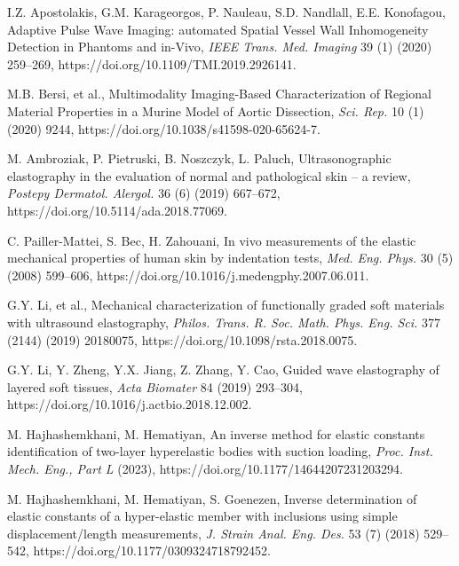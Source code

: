 \documentclass[11pt]{article}
\begin{document}
\begin{list}{}{%
  \setlength{\leftmargin}{2em}%
  \setlength{\itemindent}{-2em}%
  \setlength{\itemsep}{0.5em}%
  \setlength{\parsep}{0pt}%
}
\item [12] I.Z. Apostolakis, G.M. Karageorgos, P. Nauleau, S.D.
Nandlall, E.E. Konofagou, Adaptive Pulse Wave Imaging:
automated Spatial Vessel Wall Inhomogeneity Detection in
Phantoms and in-Vivo, \emph{IEEE Trans. Med. Imaging} 39 (1)
(2020) 259--269, https://doi.org/10.1109/TMI.2019.2926141.

\item [13] M.B. Bersi, et al., Multimodality Imaging-Based
Characterization of Regional Material Properties in a Murine
Model of Aortic Dissection, \emph{Sci. Rep.} 10 (1) (2020)
9244, https://doi.org/10.1038/s41598-020-65624-7.

\item [14] M. Ambroziak, P. Pietruski, B. Noszczyk, L. Paluch,
Ultrasonographic elastography in the evaluation of normal and
pathological skin -- a review, \emph{Postepy Dermatol. Alergol.}
36 (6) (2019) 667--672, https://doi.org/10.5114/ada.2018.77069.

\item [15] C. Pailler-Mattei, S. Bec, H. Zahouani, In vivo
measurements of the elastic mechanical properties of human
skin by indentation tests, \emph{Med. Eng. Phys.} 30 (5) (2008)
599--606, https://doi.org/10.1016/j.medengphy.2007.06.011.

\item [16] G.Y. Li, et al., Mechanical characterization of
functionally graded soft materials with ultrasound elastography,
\emph{Philos. Trans. R. Soc. Math. Phys. Eng. Sci.} 377 (2144)
(2019) 20180075, https://doi.org/10.1098/rsta.2018.0075.

\item [17] G.Y. Li, Y. Zheng, Y.X. Jiang, Z. Zhang, Y. Cao,
Guided wave elastography of layered soft tissues, \emph{Acta
Biomater} 84 (2019) 293--304,
https://doi.org/10.1016/j.actbio.2018.12.002.

\item [18] M. Hajhashemkhani, M. Hematiyan, An inverse method
for elastic constants identification of two-layer hyperelastic
bodies with suction loading, \emph{Proc. Inst. Mech. Eng., Part L}
(2023), https://doi.org/10.1177/14644207231203294.

\item [19] M. Hajhashemkhani, M. Hematiyan, S. Goenezen, Inverse
determination of elastic constants of a hyper-elastic member
with inclusions using simple displacement/length measurements,
\emph{J. Strain Anal. Eng. Des.} 53 (7) (2018) 529--542,
https://doi.org/10.1177/0309324718792452.


\end{list}
\end{document}
